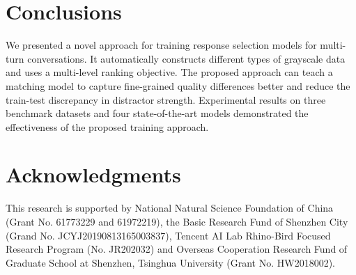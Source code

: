 \documentclass[11pt,a4paper]{article}
\begin{document}
	\section{Conclusions}
	We presented a novel approach for training response selection models for multi-turn conversations. It automatically constructs different types of grayscale data and uses a multi-level ranking objective. The proposed approach can teach a matching model to capture fine-grained quality differences better and reduce the train-test discrepancy in distractor strength. Experimental results on three benchmark datasets and four state-of-the-art models demonstrated the effectiveness of the proposed training approach.
	\section*{Acknowledgments}
	This research is supported by National Natural Science Foundation of China (Grant No. 61773229 and 61972219), the Basic Research Fund of Shenzhen City (Grand No. JCYJ20190813165003837), Tencent AI Lab Rhino-Bird Focused Research Program (No. JR202032) and Overseas Cooperation Research Fund of Graduate School at Shenzhen, Tsinghua University (Grant No. HW2018002).
	
	
\end{document}
